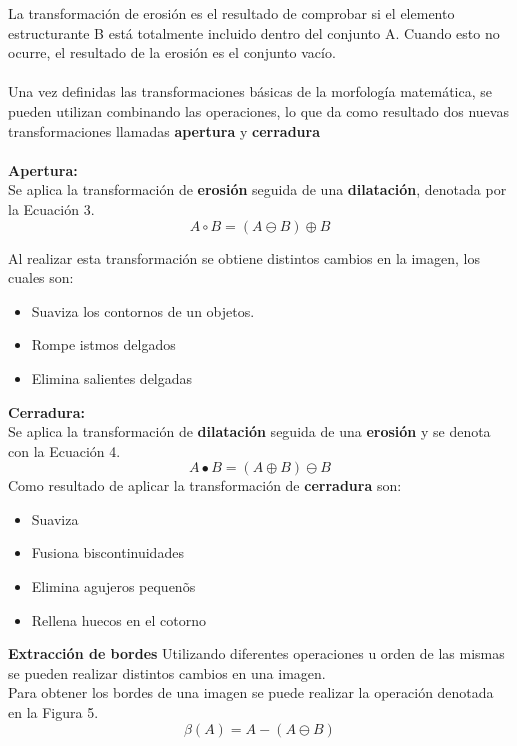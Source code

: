 \documentclass[conference]{IEEEtran}
\begin{document}
La transformaci\'on de erosi\'on es el resultado de comprobar si el elemento estructurante B est\'a totalmente incluido dentro del conjunto A. Cuando esto no ocurre, el resultado de la erosi\'on es el conjunto vac\'io.\\\\

Una vez definidas las transformaciones b\'asicas de la morfolog\'ia matem\'atica, se pueden utilizan combinando las operaciones, lo que da como resultado dos nuevas transformaciones llamadas \textbf{apertura} y \textbf{cerradura}\\\\

\textbf{Apertura: \\}
Se aplica la transformaci\'on de \textbf{erosi\'on}  seguida de una \textbf{dilataci\'on}, denotada por la Ecuaci\'on 3.\\
\begin{equation}
	A \circ B = \left( A \ominus B\right)\oplus B
\end{equation}

Al realizar esta transformaci\'on se obtiene distintos cambios en la imagen, los cuales son:
\begin{itemize}
	\item Suaviza los contornos de un objetos.
	\item Rompe istmos delgados
	\item Elimina salientes delgadas\\
\end{itemize}

\textbf{Cerradura: \\}
Se aplica la transformaci\'on de \textbf{dilataci\'on} seguida de una \textbf{erosi\'on} y se denota con la Ecuaci\'on 4.\\
\begin{equation}
	A \bullet B = (A \oplus B)\ominus B
\end{equation}
Como resultado de aplicar la transformaci\'on de \textbf{cerradura} son:
\begin{itemize}
	\item Suaviza
	\item Fusiona biscontinuidades
	\item Elimina agujeros pequen\~os
	\item Rellena huecos en el cotorno\\
\end{itemize}

\textbf{Extracci\'on de bordes}
Utilizando diferentes operaciones u orden de las mismas se pueden realizar distintos cambios en una imagen.\\
Para obtener los bordes de una imagen se puede realizar la operaci\'on denotada en la Figura 5.\\
\begin{equation}
	\beta (A) = A - \left(A \ominus B \right)
\end{equation}
\end{document}

